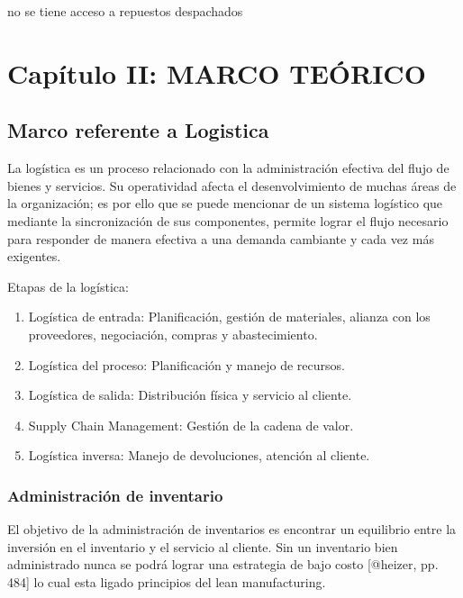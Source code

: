 \documentclass[11pt]{article}
\providecommand{\tightlist}{%
      \setlength{\itemsep}{0pt}\setlength{\parskip}{0pt}}
\begin{document}
no se tiene acceso a repuestos despachados

\hypertarget{capuxedtulo-ii-marco-teuxf3rico}{%
\section{Capítulo II: MARCO
TEÓRICO}\label{capuxedtulo-ii-marco-teuxf3rico}}

\hypertarget{marco-referente-a-logistica}{%
\subsection{Marco referente a
Logistica}\label{marco-referente-a-logistica}}

La logística es un proceso relacionado con la administración efectiva
del flujo de bienes y servicios. Su operatividad afecta el
desenvolvimiento de muchas áreas de la organización; es por ello que se
puede mencionar de un sistema logístico que mediante la sincronización
de sus componentes, permite lograr el flujo necesario para responder de
manera efectiva a una demanda cambiante y cada vez más exigentes.

Etapas de la logística:

\begin{enumerate}
\def\labelenumi{\arabic{enumi}.}
\tightlist
\item
  Logística de entrada: Planificación, gestión de materiales, alianza
  con los proveedores, negociación, compras y abastecimiento.
\item
  Logística del proceso: Planificación y manejo de recursos.
\item
  Logística de salida: Distribución física y servicio al cliente.
\item
  Supply Chain Management: Gestión de la cadena de valor.
\item
  Logística inversa: Manejo de devoluciones, atención al cliente.
\end{enumerate}

\hypertarget{administraciuxf3n-de-inventario}{%
\subsubsection{Administración de
inventario}\label{administraciuxf3n-de-inventario}}

El objetivo de la administración de inventarios es encontrar un
equilibrio entre la inversión en el inventario y el servicio al cliente.
Sin un inventario bien administrado nunca se podrá lograr una estrategia
de bajo costo {[}@heizer, pp. 484{]} lo cual esta ligado principios del
lean manufacturing.
\end{document}
